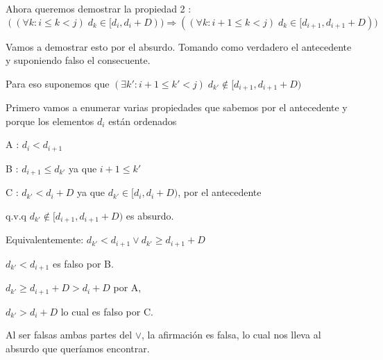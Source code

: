 Ahora queremos demostrar la propiedad 2 : $((\forall k: i \leq k < j)\;d_k \in [d_i, d_i + D)) \Rightarrow ((\forall k: i + 1 \leq k < j)\;d_k \in [d_{i+1}, d_{i+1} + D))$

Vamos a demostrar esto por el absurdo. Tomando como verdadero el antecedente y suponiendo falso el consecuente.

Para eso suponemos que $(\exists k': i+1\leq k' < j) \;d_{k'} \notin [d_{i+1}, d_{i+1} + D) $

Primero vamos a enumerar varias propiedades que sabemos por el antecedente y porque los elementos $d_i$ están ordenados

A : $d_i < d_{i+1}$

B : $d_{i+1} \leq d_{k'}$ ya que $i+1 \leq k'$

C : $d_{k'} < d_i +D$ ya que $d_{k'} \in [d_i,d_i +D)$, por el antecedente

q.v.q $d_{k'} \notin [d_{i+1}, d_{i+1} + D)$ es absurdo.

Equivalentemente: $d_{k'} < d_{i+1} \vee d_{k'} \geq d_{i+1} + D $ 

$d_{k'} < d_{i+1}$ es falso por B.

$d_{k'} \geq d_{i+1} + D  > d_i + D$ por A,

$d_{k'} > d_i + D$ lo cual es falso por C.

Al ser falsas ambas partes del $\vee$, la afirmación es falsa, lo cual nos lleva al absurdo que queríamos encontrar.

